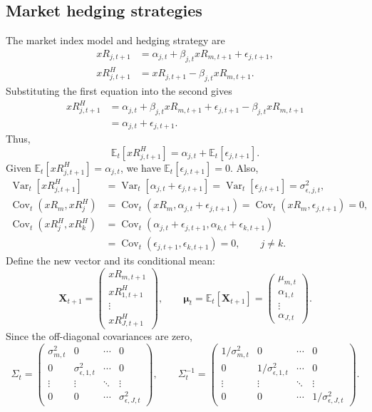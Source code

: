 \documentclass[11pt]{article}
\newcommand{\Et}{\mathbb{E}_t}
\newcommand{\Vt}{\operatorname{Var}_t}
\newcommand{\Ct}{\operatorname{Cov}_t}
\begin{document}
\subsection*{Market hedging strategies}
The market index model and hedging strategy are
\begin{align*}
xR_{j,t+1}&=\alpha_{j,t}+\beta_{j,t}xR_{m,t+1}+\epsilon_{j,t+1},\\
xR^H_{j,t+1}&=xR_{j,t+1}-\beta_{j,t}xR_{m,t+1}.
\end{align*}
Substituting the first equation into the second gives
\begin{align*}
xR^H_{j,t+1}
&=\alpha_{j,t}+\beta_{j,t}xR_{m,t+1}
 +\epsilon_{j,t+1}-\beta_{j,t}xR_{m,t+1}\\
&=\alpha_{j,t}+\epsilon_{j,t+1}.
\end{align*}
Thus,
\[
\Et[xR^H_{j,t+1}]=\alpha_{j,t}+\Et[\epsilon_{j,t+1}].
\]
Given $\Et[xR^H_{j,t+1}]=\alpha_{j,t}$, we have
$\Et[\epsilon_{j,t+1}]=0$. Also,
\begin{align*}
\Vt[xR^H_{j,t+1}]
&=\Vt[\alpha_{j,t}+\epsilon_{j,t+1}]
=\Vt[\epsilon_{j,t+1}]=\sigma^2_{\epsilon,j,t},\\
\Ct(xR_m,xR^H_j)
&=\Ct(xR_m,\alpha_{j,t}+\epsilon_{j,t+1})
=\Ct(xR_m,\epsilon_{j,t+1})=0,\\
\Ct(xR^H_j,xR^H_k)
&=\Ct(\alpha_{j,t}+\epsilon_{j,t+1},
\alpha_{k,t}+\epsilon_{k,t+1})\\
&=\Ct(\epsilon_{j,t+1},\epsilon_{k,t+1})=0,
\qquad j\ne k.
\end{align*}
Define the new vector and its conditional mean:
\[
\mathbf X_{t+1}=
\begin{pmatrix}xR_{m,t+1}\\xR^H_{1,t+1}\\\vdots\\xR^H_{J,t+1}\end{pmatrix},
\qquad
\boldsymbol\mu_t=\Et[\mathbf X_{t+1}]
=\begin{pmatrix}\mu_{m,t}\\\alpha_{1,t}\\\vdots\\\alpha_{J,t}\end{pmatrix}.
\]
Since the off-diagonal covariances are zero,
\[
\Sigma_t=\begin{pmatrix}
\sigma^2_{m,t}&0&\cdots&0\\
0&\sigma^2_{\epsilon,1,t}&\cdots&0\\
\vdots&\vdots&\ddots&\vdots\\
0&0&\cdots&\sigma^2_{\epsilon,J,t}
\end{pmatrix},\qquad
\Sigma_t^{-1}=\begin{pmatrix}
1/\sigma^2_{m,t}&0&\cdots&0\\
0&1/\sigma^2_{\epsilon,1,t}&\cdots&0\\
\vdots&\vdots&\ddots&\vdots\\
0&0&\cdots&1/\sigma^2_{\epsilon,J,t}
\end{pmatrix}.
\]
\clearpage
\end{document}
